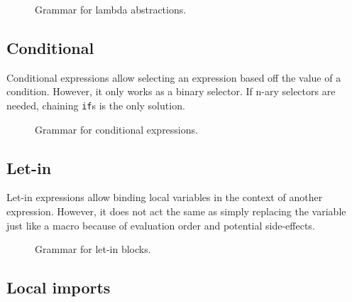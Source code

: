 \begin{figure}[H]
	\centering


	\caption{Grammar for lambda abstractions.}
	\label{fig:zilch-gramma-expressions-lambda-grammar}
\end{figure}

\subsection{Conditional}\label{subsec:zilch-grammar-expressions-conditional}

Conditional expressions allow selecting an expression based off the value of a condition.
However, it only works as a binary selector.
If n-ary selectors are needed, chaining \texttt{if}s is the only solution.

\begin{figure}[H]
	\centering


	\caption{Grammar for conditional expressions.}
	\label{fig:zilch-gramma-expressions-conditional-grammar}
\end{figure}

\subsection{Let-in}\label{subsec:zilch-grammar-expressions-letin}

Let-in expressions allow binding local variables in the context of another expression.
However, it does not act the same as simply replacing the variable just like a macro because of evaluation order and potential side-effects.

\begin{figure}[H]
	\centering


	\caption{Grammar for let-in blocks.}
	\label{fig:zilch-grammar-expressions-letin-grammar}
\end{figure}

\subsection{Local imports}\label{subsec:zilch-grammar-expressions-import}

